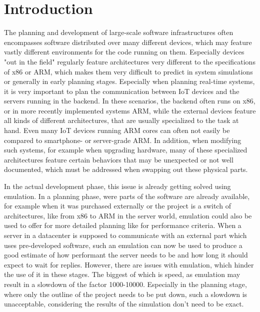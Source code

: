 
\chapter{Introduction}
The planning and development of large-scale software infrastructures often encompasses software distributed over many different devices,
which may feature vastly different environments for the code running on them.
Especially devices "out in the field" regularly feature architectures very different to the specifications of x86 or ARM,
which makes them very difficult to predict in system simulations or generally in early planning stages.
Especially when planning real-time systems,
it is very important to plan the communication between IoT devices and the servers running in the backend.
In these scenarios, the backend often runs on x86, or in more recently implemented systems ARM,
while the external devices feature all kinds of different architectures,
that are usually specialized to the task at hand.
Even many IoT devices running ARM cores can often not easily be compared to smartphone- or server-grade ARM.
In addition, when modifying such systems, for example when upgrading hardware,
many of these specialized architectures feature certain behaviors that may be unexpected or not well documented,
which must be addressed when swapping out these physical parts.

In the actual development phase, this issue is already getting solved using emulation.
In a planning phase, were parts of the software are already available,
for example when it was purchased externally or the project is a switch of architectures,
like from x86 to ARM in the server world,
emulation could also be used to offer for more detailed planning
like for performance criteria.
When a server in a datacenter is supposed to communicate with an external part which uses pre-developed software,
such an emulation can now be used to produce a good estimate of how performant the server needs to be and how long it should expect to wait for replies.
However, there are issues with emulation, which hinder the use of it in these stages.
The biggest of which is speed, as emulation may result in a slowdown of the factor 1000-10000\cite{slowdown}.
Especially in the planning stage, where only the outline of the project needs to be put down,
such a slowdown is unacceptable, considering the results of the simulation don't need to be exact.

